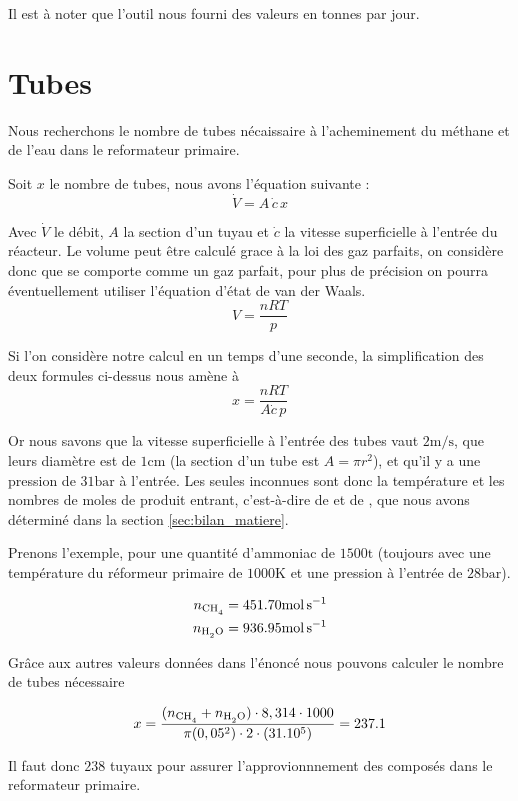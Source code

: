 Il est à noter que l'outil nous fourni des valeurs en tonnes par jour.

\section{Tubes}

Nous recherchons le nombre de tubes nécaissaire à l'acheminement du 
méthane et de l'eau dans le reformateur primaire.

Soit $x$ le nombre de tubes, nous avons l'équation suivante :
\[
	\dot{V} = A \, \dot{c} \, x
\]

Avec $\dot{V}$ le débit, $A$ la section d'un tuyau 
et $\dot{c}$ la vitesse superficielle à l'entrée du réacteur.
Le volume peut être calculé grace à la loi des gaz parfaits,
on considère donc que  se comporte comme un gaz parfait,
pour plus de précision on pourra éventuellement utiliser l'équation
d'état de van der Waals.
\[
	V = \frac{n R T}{p}
\]

Si l'on considère notre calcul en un temps d'une seconde, 
la simplification des deux formules ci-dessus nous amène à
\[
	x = \frac{n R T}{A \dot{c} \, p}
\]

Or nous savons que la vitesse superficielle à l'entrée des tubes 
vaut $2 \si{\meter\per\second}$,
que leurs diamètre est de $1 \si{\centi\meter}$ 
(la section d'un tube est $A = \pi r^2$),
et qu'il y a une pression de $31 \si{\bar}$ à l'entrée.
Les seules inconnues sont donc la température et les nombres de moles
de produit entrant, c'est-à-dire de  et de ,
que nous avons déterminé dans la section \ref{sec:bilan_matiere}.

Prenons l'exemple, pour une quantité d'ammoniac de $1500 \si{\tonne}$ 
(toujours avec une température du réformeur primaire de $1000\si{\kelvin}$
et une pression à l'entrée de $28\si{\bar}$).

\begin{align*}
	n_{\ce{CH4}} = 451.70 \si{\mole\per\second} \\
	n_{\ce{H2O}} = 936.95 \si{\mole\per\second}
\end{align*}

Grâce aux autres valeurs données dans l'énoncé 
nous pouvons calculer le nombre de tubes nécessaire 

\[
 x = \frac{(n_{\ce{CH4}}+n_{\ce{H2O}}) \cdot 8,314 \cdot 1000}
	{\pi (0,05^2) \cdot 2 \cdot (31.10^5)} = 237.1
\]

Il faut donc $238$ tuyaux pour assurer l'approvionnnement 
des composés dans le reformateur primaire.

